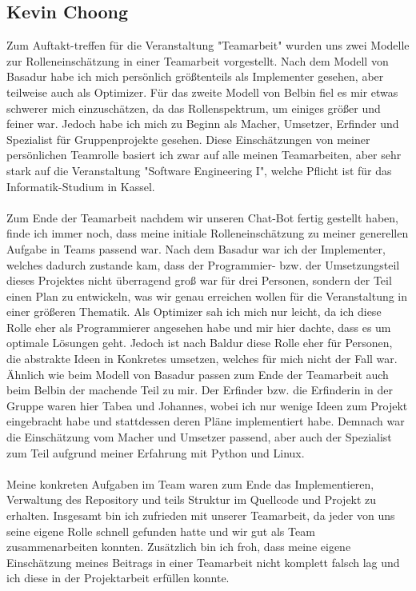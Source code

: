 \documentclass[12pt]{article}
\begin{document}
\clearpage
\subsection{Kevin Choong}
Zum Auftakt-treffen für die Veranstaltung "Teamarbeit" wurden uns zwei Modelle zur Rolleneinschätzung in einer Teamarbeit vorgestellt. Nach dem Modell von Basadur habe ich mich persönlich größtenteils als Implementer gesehen, aber teilweise auch als Optimizer. Für das zweite Modell von Belbin fiel es mir etwas schwerer mich einzuschätzen, da das Rollenspektrum, um einiges größer und feiner war. Jedoch habe ich mich zu Beginn als Macher, Umsetzer, Erfinder und Spezialist für Gruppenprojekte gesehen. Diese Einschätzungen von meiner persönlichen Teamrolle basiert ich zwar auf alle meinen Teamarbeiten, aber sehr stark auf die Veranstaltung "Software Engineering I", welche Pflicht ist für das Informatik-Studium in Kassel.
\\ \\
Zum Ende der Teamarbeit nachdem wir unseren Chat-Bot fertig gestellt haben, finde ich immer noch, dass meine initiale Rolleneinschätzung zu meiner generellen Aufgabe in Teams passend war. Nach dem Basadur war ich der Implementer, welches dadurch zustande kam, dass der Programmier- bzw. der Umsetzungsteil dieses Projektes nicht überragend groß war für drei Personen, sondern der Teil einen Plan zu entwickeln, was wir genau erreichen wollen für die Veranstaltung in einer größeren Thematik.
Als Optimizer sah ich mich nur leicht, da ich diese Rolle eher als Programmierer angesehen habe und mir hier dachte, dass es um optimale Lösungen geht. Jedoch ist nach Baldur diese Rolle eher für Personen, die abstrakte Ideen in Konkretes umsetzen, welches für mich nicht der Fall war. Ähnlich wie beim Modell von Basadur passen zum Ende der Teamarbeit auch beim Belbin der machende Teil zu mir. Der Erfinder bzw. die Erfinderin in der Gruppe waren hier Tabea und Johannes, wobei ich nur wenige Ideen zum Projekt eingebracht habe und stattdessen deren Pläne implementiert habe. Demnach war die Einschätzung vom Macher und Umsetzer passend, aber auch der Spezialist zum Teil aufgrund meiner Erfahrung mit Python und Linux.
\\ \\
Meine konkreten Aufgaben im Team waren zum Ende das Implementieren, Verwaltung des Repository und teils Struktur im Quellcode und Projekt zu erhalten. Insgesamt bin ich zufrieden mit unserer Teamarbeit, da jeder von uns seine eigene Rolle schnell gefunden hatte und wir gut als Team zusammenarbeiten konnten. Zusätzlich bin ich froh, dass meine eigene Einschätzung meines Beitrags in einer Teamarbeit nicht komplett falsch lag und ich diese in der Projektarbeit erfüllen konnte.
\end{document}

